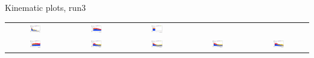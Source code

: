 \documentclass[usenames,dvipsnames]{beamer}
\begin{document}
\begin{frame}{Kinematic plots, run3}
{\begin{tabular}{ccccc}
\includegraphics[width=0.20\textwidth]{graphics/HH_run3/HH_met_fb_MT2.png} &
\includegraphics[width=0.20\textwidth]{graphics/HH_run3/HH_met_fb_nJets.png} &
\includegraphics[width=0.20\textwidth]{graphics/HH_run3/HH_met_fb_bNumber.png} \\
\includegraphics[width=0.20\textwidth]{graphics/HH_run3/HH_met_fb_pt_jet1.png} &
\includegraphics[width=0.20\textwidth]{graphics/HH_run3/HH_met_fb_dRtt.png} &
\includegraphics[width=0.20\textwidth]{graphics/HH_run3/HH_met_fb_dPhit1x.png} &
\includegraphics[width=0.20\textwidth]{graphics/HH_run3/HH_met_fb_dPhit2x.png} &
\includegraphics[width=0.20\textwidth]{graphics/HH_run3/HH_met_fb_dPhitt.png}
\end{tabular}
}

\end{frame}
\end{document}
